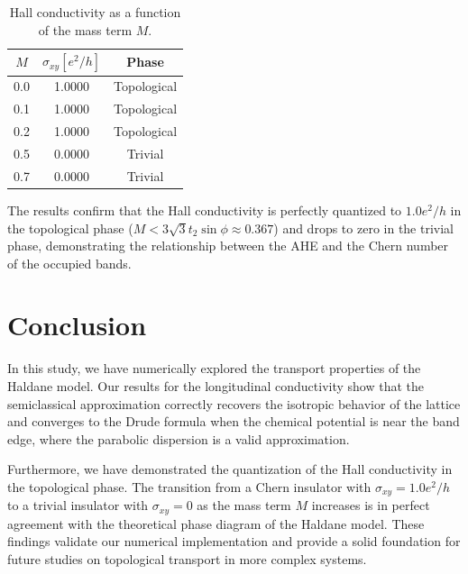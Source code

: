 \documentclass[12pt,a4paper]{article}
\begin{document}
\begin{table}[h]
    \centering
    \begin{tabular}{|c|c|c|}
        \hline
        $M$ & $\sigma_{xy} [e^2/h]$ & Phase \\
        \hline
        0.0 & 1.0000 & Topological \\
        0.1 & 1.0000 & Topological \\
        0.2 & 1.0000 & Topological \\
        0.5 & 0.0000 & Trivial \\
        0.7 & 0.0000 & Trivial \\
        \hline
    \end{tabular}
    \caption{Hall conductivity as a function of the mass term $M$.}
    \label{tab:ahe}
\end{table}

The results confirm that the Hall conductivity is perfectly quantized to $1.0 e^2/h$ in the topological phase ($M < 3\sqrt{3}t_2 \sin \phi \approx 0.367$) and drops to zero in the trivial phase, demonstrating the relationship between the AHE and the Chern number of the occupied bands.

\section{Conclusion}
In this study, we have numerically explored the transport properties of the Haldane model. Our results for the longitudinal conductivity show that the semiclassical approximation correctly recovers the isotropic behavior of the lattice and converges to the Drude formula when the chemical potential is near the band edge, where the parabolic dispersion is a valid approximation. 

Furthermore, we have demonstrated the quantization of the Hall conductivity in the topological phase. The transition from a Chern insulator with $\sigma_{xy}=1.0 e^2/h$ to a trivial insulator with $\sigma_{xy}=0$ as the mass term $M$ increases is in perfect agreement with the theoretical phase diagram of the Haldane model. These findings validate our numerical implementation and provide a solid foundation for future studies on topological transport in more complex systems.
\end{document}
